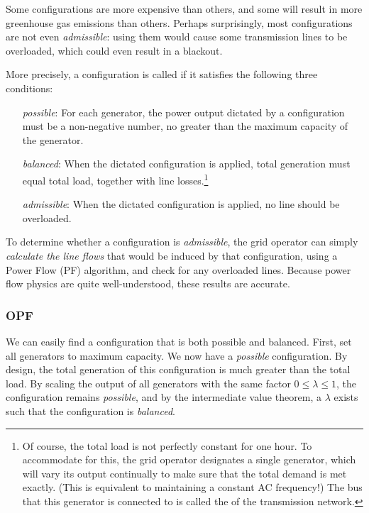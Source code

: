 \documentclass[main.tex]{subfiles}
\begin{document}
Some configurations are more expensive than others, and some will result in more greenhouse gas emissions than others. Perhaps surprisingly, most configurations are not even \emph{admissible}: using them would cause some transmission lines to be overloaded, which could even result in a blackout. 

More precisely, a configuration is called  if it satisfies the following three conditions:
\begin{itemize}[labelwidth =, leftmargin = !]
    \item[\emph{possible}\index{configuration!possible}:] For each generator, the power output dictated by a configuration must be a non-negative number, no greater than the maximum capacity of the generator.
    \item[\emph{balanced}\index{configuration!balanced}:] When the dictated configuration is applied, total generation must equal total load, together with line losses.\footnote{Of course, the total load is not perfectly constant for one hour. To accommodate for this, the grid operator designates a single  generator, which will vary its output continually to make sure that the total demand is met exactly. (This is equivalent to maintaining a constant AC frequency!) The bus that this generator is connected to is called the  of the transmission network.}
    \item[\emph{admissible}\index{configuration!admissible}:] When the dictated configuration is applied, no line should be overloaded.
\end{itemize}

To determine whether a configuration is \emph{admissible}, the grid operator can simply \emph{calculate the line flows} that would be induced by that configuration, using a Power Flow (PF) algorithm, and check for any overloaded lines. Because power flow physics are quite well-understood, these results are accurate.



\subsubsection*{OPF}

We can easily find a configuration that is both {possible} and {balanced}. First, set all generators to maximum capacity. We now have a \emph{possible} configuration. By design, the total generation of this configuration is much greater than the total load. By scaling the output of all generators with the same factor $0 \leq \lambda \leq 1$, the configuration remains \emph{possible}, and by the intermediate value theorem, a $\lambda$ exists such that the configuration is \emph{balanced}.
\end{document}
